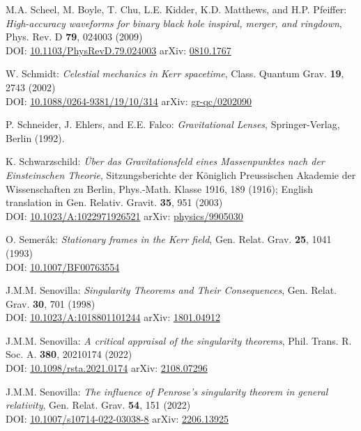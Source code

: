 \begin{thebibliography}{123}
M.A. Scheel, M. Boyle, T. Chu, L.E. Kidder, K.D. Matthews, and H.P. Pfeiffer:
{\em High-accuracy waveforms for binary black hole inspiral, merger, and ringdown},
Phys. Rev. D {\bf 79}, 024003 (2009)\\
DOI: \href{https://doi.org/10.1103/PhysRevD.79.024003}{10.1103/PhysRevD.79.024003}\hfill
arXiv: \href{https://arxiv.org/abs/0810.1767}{0810.1767}

W. Schmidt:
{\em Celestial mechanics in Kerr spacetime},
Class. Quantum Grav. {\bf 19}, 2743 (2002)\\
DOI: \href{https://doi.org/10.1088/0264-9381/19/10/314}{10.1088/0264-9381/19/10/314}\hfill
arXiv: \href{https://arxiv.org/abs/gr-qc/0202090}{gr-qc/0202090}

P. Schneider, J. Ehlers, and E.E. Falco:
{\em Gravitational Lenses},
Springer-Verlag, Berlin (1992).

K. Schwarzschild:
{\em \"Uber das Gravitationsfeld eines Massenpunktes nach der Einsteinschen Theorie},
Sitzungsberichte der K\"oniglich Preussischen Akademie der Wissenschaften zu Berlin, Phys.-Math. Klasse 1916, 189 (1916);
English translation in Gen. Relativ. Gravit. {\bf 35}, 951 (2003)\\
DOI: \href{https://doi.org/10.1023/A:1022971926521}{10.1023/A:1022971926521}\hfill
arXiv: \href{https://arxiv.org/abs/physics/9905030}{physics/9905030}

O. Semer\'ak:
{\em Stationary frames in the Kerr field},
Gen. Relat. Grav. {\bf 25}, 1041 (1993)\\
DOI: \href{https://doi.org/10.1007/BF00763554}{10.1007/BF00763554}

J.M.M. Senovilla:
{\em Singularity Theorems and Their Consequences},
Gen. Relat. Grav. {\bf 30}, 701 (1998)\\
DOI: \href{https://doi.org/10.1023/A:1018801101244}{10.1023/A:1018801101244}\hfill
arXiv: \href{https://arxiv.org/abs/1801.04912}{1801.04912}

J.M.M. Senovilla:
{\em A critical appraisal of the singularity theorems},
Phil. Trans. R. Soc. A. {\bf 380}, 20210174 (2022)\\
DOI: \href{https://doi.org/10.1098/rsta.2021.0174}{10.1098/rsta.2021.0174}\hfill
arXiv: \href{https://arxiv.org/abs/2108.07296}{2108.07296}

J.M.M. Senovilla:
{\em The influence of Penrose’s singularity theorem in general relativity},
Gen. Relat. Grav.  {\bf 54}, 151 (2022)\\
DOI: \href{https://doi.org/10.1007/s10714-022-03038-8}{10.1007/s10714-022-03038-8}\hfill
arXiv: \href{https://arxiv.org/abs/2206.13925}{2206.13925}


\end{thebibliography}
